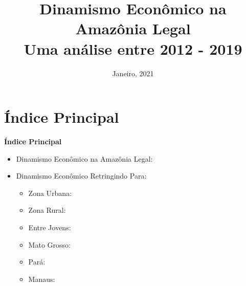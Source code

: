 \documentclass[10pt]{beamer}
\date{Janeiro, 2021}
\title{Dinamismo Econômico na Amazônia Legal \\ Uma análise entre 2012 - 2019}
\begin{document}

\begin{frame}
\titlepage
\end{frame}


\section{Índice Principal}

\begin{frame}[label=indice_principal]{}

\textbf{Índice Principal}
\vspace{2mm}
\begin{itemize}

\item{Dinamismo Econômico na Amazônia Legal: \hyperlink{indice_principal_amz}{}}
\vspace{3mm}

\item{Dinamismo Econômico Retringindo Para:
	\begin{itemize}
	\item{Zona Urbana: \hyperlink{indice_principal_amz_urbana}{}}
	\vspace{1mm}

	\item{Zona Rural: \hyperlink{indice_principal_amz_rural}{}}
	\vspace{1mm}

	\item{Entre Jovens: \hyperlink{indice_principal_amz_mt}{}}
	\vspace{1mm}

	\item{Mato Grosso: \hyperlink{indice_principal_amz_mt}{}}
	\vspace{1mm}

	\item{Pará: \hyperlink{indice_principal_amz_pa}{}}
	\vspace{1mm}

	\item{Manaus: \hyperlink{indice_principal_amz_manaus}{}}
	\vspace{1mm}
	\end{itemize}
}

\end{itemize}

\end{frame}
\end{document}
